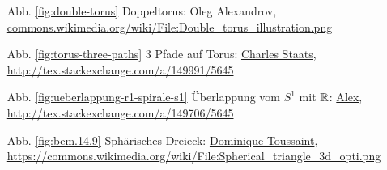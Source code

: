 \begin{itemize}
    \item[Abb. \ref{fig:double-torus}] Doppeltorus: Oleg Alexandrov, \href{https://commons.wikimedia.org/wiki/File:Double_torus_illustration.png}{commons.wikimedia.org/wiki/File:Double\_torus\_illustration.png}
    \item[Abb. \ref{fig:torus-three-paths}] 3 Pfade auf Torus: \href{http://tex.stackexchange.com/users/484/charles-staats}{Charles Staats}, \url{http://tex.stackexchange.com/a/149991/5645}
    \item[Abb. \ref{fig:ueberlappung-r1-spirale-s1}] Überlappung vom $S^1$ mit $\mathbb{R}$: \href{http://tex.stackexchange.com/users/22467/alex}{Alex}, \url{http://tex.stackexchange.com/a/149706/5645}
    \item[Abb. \ref{fig:bem.14.9}] Sphärisches Dreieck: \href{https://commons.wikimedia.org/wiki/User:DemonDeLuxe}{Dominique Toussaint},\\
        \url{https://commons.wikimedia.org/wiki/File:Spherical_triangle_3d_opti.png}
\end{itemize}
